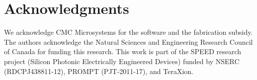 \documentclass[letterpaper,10pt]{article}
\begin{document}
\section*{Acknowledgments}
We acknowledge CMC Microsystems for the  software and the fabrication subsidy. The authors acknowledge the Natural Sciences and Engineering Research Council of Canada for funding this research. This work is part of the SPEED research project (Silicon Photonic Electrically Engineered Devices) funded by NSERC (RDCPJ438811-12), PROMPT (PJT-2011-17), and TeraXion.



\end{document}
